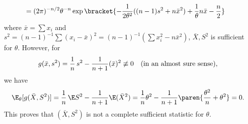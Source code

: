 \documentclass{homework}
\begin{document}
{\begin{enumerate}[label={(\alph*)}, topsep=0pt]
\begin{align*}
            \\ &= (2\pi)^{-n/2} \theta^{-n} \exp\bracket{ -\frac{1}{2\theta^2}((n-1)s^2 + n\bar x^2) + \frac 1\theta n\bar x - \frac n 2 }
        \end{align*}
        where $\bar x = \sum x_i$ and $s^2 = (n-1)^{-1}\sum (x_i - \bar x)^2 = (n-1)^{-1} (\sum x_i^2 - n\bar x^2)$, $\bar X, S^2$ is sufficient for $\theta$. However, for
        \begin{align*}
            g(\bar x, s^2) = \frac 1 n\, s^2 - \frac{1}{n+1}(\bar x)^2\not\equiv 0\text{\quad(in an almost sure sense)},
        \end{align*}
        we have
        \begin{align*}
            \E_\theta [g(\bar X, S^2)] = \frac 1 n\,\E S^2 - \frac 1{n+1} \E(\bar X^2) = \frac 1 n \theta^2 - \frac 1{n+1} \paren{\frac{\theta^2}n + \theta^2} = 0.
        \end{align*}
        This proves that $(\bar X, S^2)$ is not a complete sufficient statistic for $\theta$.
    \end{enumerate}
}
\end{document}

